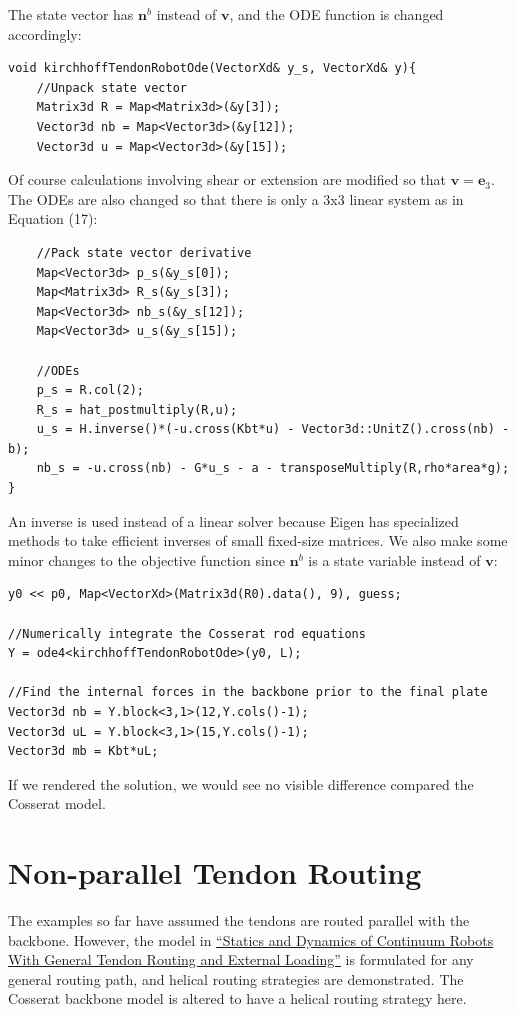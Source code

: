\documentclass[12pt]{article}
\begin{document}
The state vector has $\boldsymbol{n}^b$ instead of $\boldsymbol{v}$, and the ODE function is changed accordingly:
\begin{lstlisting}
void kirchhoffTendonRobotOde(VectorXd& y_s, VectorXd& y){
    //Unpack state vector
    Matrix3d R = Map<Matrix3d>(&y[3]);
    Vector3d nb = Map<Vector3d>(&y[12]);
    Vector3d u = Map<Vector3d>(&y[15]);
\end{lstlisting}
Of course calculations involving shear or extension are modified so that $\boldsymbol{v} = \boldsymbol{e}_3$. The ODEs are also changed so that there is only a 3x3 linear system as in Equation (17):
\begin{lstlisting}
    //Pack state vector derivative
    Map<Vector3d> p_s(&y_s[0]);
    Map<Matrix3d> R_s(&y_s[3]);
    Map<Vector3d> nb_s(&y_s[12]);
    Map<Vector3d> u_s(&y_s[15]);

    //ODEs
    p_s = R.col(2);
    R_s = hat_postmultiply(R,u);
    u_s = H.inverse()*(-u.cross(Kbt*u) - Vector3d::UnitZ().cross(nb) - b);
    nb_s = -u.cross(nb) - G*u_s - a - transposeMultiply(R,rho*area*g);
}
\end{lstlisting}
An inverse is used instead of a linear solver because Eigen has specialized methods to take efficient inverses of small fixed-size matrices.
We also make some minor changes to the objective function since $\boldsymbol{n}^b$ is a state variable instead of $\boldsymbol{v}$:
\begin{lstlisting}
y0 << p0, Map<VectorXd>(Matrix3d(R0).data(), 9), guess;

//Numerically integrate the Cosserat rod equations
Y = ode4<kirchhoffTendonRobotOde>(y0, L);

//Find the internal forces in the backbone prior to the final plate
Vector3d nb = Y.block<3,1>(12,Y.cols()-1);
Vector3d uL = Y.block<3,1>(15,Y.cols()-1);
Vector3d mb = Kbt*uL;
\end{lstlisting}
If we rendered the solution, we would see no visible difference compared the Cosserat model.

\section{Non-parallel Tendon Routing}

The examples so far have assumed the tendons are routed parallel with the backbone. However, the model in
\href{https://ieeexplore.ieee.org/document/5957337}{``Statics and Dynamics of Continuum Robots With General Tendon Routing and External Loading''} is formulated for any general routing path, and helical routing strategies are demonstrated. The Cosserat backbone model is altered to have a helical routing strategy here.
\end{document}
